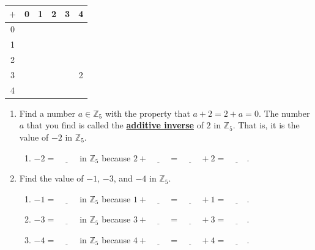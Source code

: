\documentclass[11pt]{article}
\renewcommand\emph[1]{\underline{\bf{#1}}} %
\theoremstyle{definition}
\begin{document}
  \begin{center}
    \begin{tabular}{|c|c|c|c|c|c|}\\ \hline
      $+$ & 0 & 1 & 2 & 3 & 4 \\ \hline
      0   &   &   &   &   &   \\ \hline
      1   &   &   &   &   &   \\ \hline
      2   &   &   &   &   &   \\ \hline
      3   &   &   &   &   & 2 \\ \hline
      4   &   &   &   &   &   \\ \hline
    \end{tabular}
  \end{center}
    \begin{enumerate}
      \item Find a number $a \in \mathbb{Z}_5$ with the property that $a + 2 = 2 + a = 0$. The number $a$ that you find is called the \emph{additive inverse} of $2$ in 
    $\mathbb{Z}_5$. That is, it is the value of $-2$ in $\mathbb{Z}_5$.
    \begin{enumerate}
      \item $-2 = \underline{\hspace{1cm}}$ in $\mathbb{Z}_5$ because $2 + \underline{\hspace{1cm}} = \underline{\hspace{1cm}} + 2 = \underline{\hspace{1cm}}$.
    \end{enumerate}
    \item Find the value of $-1$, $-3$, and $-4$ in $\mathbb{Z}_5$.
    \begin{enumerate}
      \item $-1 = \underline{\hspace{1cm}}$ in $\mathbb{Z}_5$ because $1 + \underline{\hspace{1cm}} = \underline{\hspace{1cm}} + 1 = \underline{\hspace{1cm}}$.
      \item $-3 = \underline{\hspace{1cm}}$ in $\mathbb{Z}_5$ because $3 + \underline{\hspace{1cm}} = \underline{\hspace{1cm}} + 3 = \underline{\hspace{1cm}}$.
      \item $-4 = \underline{\hspace{1cm}}$ in $\mathbb{Z}_5$ because $4 + \underline{\hspace{1cm}} = \underline{\hspace{1cm}} + 4 = \underline{\hspace{1cm}}$.
    \end{enumerate}
  \end{enumerate}
\end{document}
